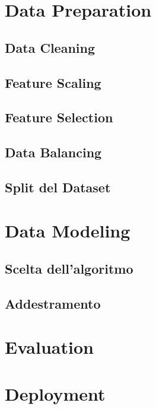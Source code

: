 \documentclass{article}
\begin{document}
\newpage
\section{Data Preparation}
    \subsection{Data Cleaning}
    \subsection{Feature Scaling}
    \subsection{Feature Selection}
    \subsection{Data Balancing}
    \subsection{Split del Dataset}

\newpage
\section{Data Modeling}
    \subsection{Scelta dell'algoritmo}
    \subsection{Addestramento}

\newpage
\section{Evaluation}

\newpage
\section{Deployment}
\end{document}
